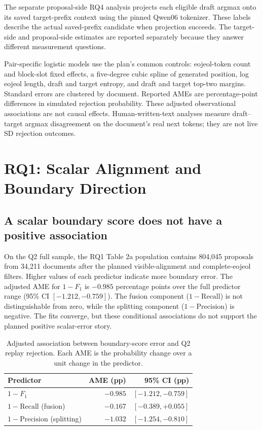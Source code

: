\documentclass[11pt]{article}
\begin{document}
The separate proposal-side RQ4 analysis projects each eligible draft argmax
onto its saved target-prefix context using the pinned Qwen06 tokenizer. These
labels describe the actual saved-prefix candidate when projection succeeds.
The target-side and proposal-side estimates are reported separately because
they answer different measurement questions.

Pair-specific logistic models use the plan's common controls: eojeol-token
count and block-slot fixed effects, a five-degree cubic spline of generated
position, log eojeol length, draft and target entropy, and draft and target
top-two margins. Standard errors are clustered by document. Reported AMEs are
percentage-point differences in simulated rejection probability. These
adjusted observational associations are not causal effects. Human-written-text
analyses measure draft--target argmax disagreement on the document's real next
tokens; they are not live SD rejection outcomes.

\section{RQ1: Scalar Alignment and Boundary Direction}
\label{sec:rq1}

\subsection{A scalar boundary score does not have a positive association}

On the Q2 full sample, the RQ1 Table 2a population contains 804,045 proposals
from 34,211 documents after the planned visible-alignment and complete-eojeol
filters. Higher values of each predictor indicate more boundary error. The
adjusted AME for $1-F_1$ is $-0.985$ percentage points over the full
predictor range (95\% CI $[-1.212,-0.759]$). The fusion component
($1-\mathrm{Recall}$) is not distinguishable from zero, while the splitting
component ($1-\mathrm{Precision}$) is negative. The fits converge, but these
conditional associations do not support the planned positive scalar-error
story.

\begin{table}[t]
\centering
\small
\begin{tabular}{lrr}
\toprule
Predictor & AME (pp) & 95\% CI (pp) \\
\midrule
$1-F_1$ & $-0.985$ & $[-1.212,-0.759]$ \\
$1-\mathrm{Recall}$ (fusion) & $-0.167$ & $[-0.389,+0.055]$ \\
$1-\mathrm{Precision}$ (splitting) & $-1.032$ & $[-1.254,-0.810]$ \\
\bottomrule
\end{tabular}
\caption{Adjusted association between boundary-score error and Q2 replay
rejection. Each AME is the probability change over a unit change in the
predictor.}
\label{tab:scalar}
\end{table}
\end{document}
